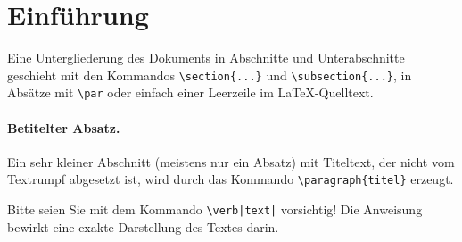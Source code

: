 %
%

\section{Einführung}

Eine Untergliederung des Dokuments in Abschnitte und Unterabschnitte
geschieht mit den Kommandos \verb|\section{...}| und \verb|\subsection{...}|,
in Absätze mit \verb|\par| oder einfach einer Leerzeile im \LaTeX-Quelltext.

\paragraph{Betitelter Absatz.}
Ein sehr kleiner Abschnitt (meistens nur ein Absatz)
mit Titeltext, der nicht vom Textrumpf abgesetzt ist, wird durch das Kommando
\verb|\paragraph{titel}| erzeugt.

Bitte seien Sie mit dem Kommando \verb?\verb|text|? vorsichtig! Die Anweisung bewirkt eine exakte Darstellung des Textes darin.